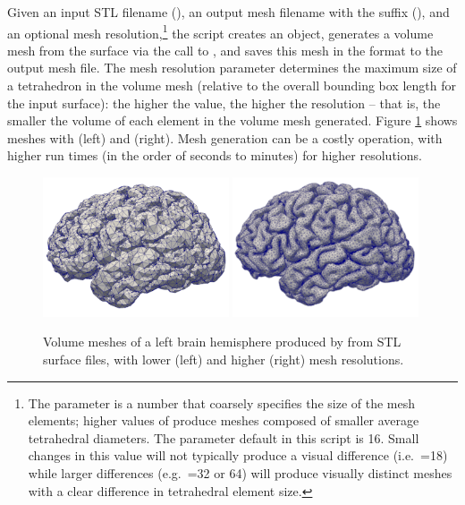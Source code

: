 \noindent Given an input STL filename (), an
output mesh filename with the  suffix
(), and an optional mesh resolution,\footnote{
  The  parameter is a number that coarsely
  specifies the size of the mesh elements; higher values of
   produce meshes composed of smaller
  average tetrahedral diameters. The 
  parameter default in this script is 16. Small changes in this value
  will not typically produce a visual difference
  (i.e.~=18) while larger differences
  (e.g.~=32 or 64) will produce visually
  distinct meshes with a clear difference in tetrahedral element
  size.} the script creates an \svmtk{}  object,
generates a volume mesh from the surface via the call to
, and saves this mesh in the
 format to the output mesh file. The mesh
resolution parameter determines the maximum size of a tetrahedron in
the volume mesh (relative to the overall bounding box length for the
input surface): the higher the value, the higher the resolution --
that is, the smaller the volume of each element in the volume mesh
generated. Figure \ref{fig:chp3:ernie-volume-mesh} shows meshes with
 (left) and  (right). Mesh generation can be a costly operation, with higher
run times (in the order of seconds to minutes) for higher resolutions.
\begin{figure}
  \includegraphics[width=0.49\textwidth]{./graphics/chp3/ernie-volume-16-r.png}
  \includegraphics[width=0.49\textwidth]{./graphics/chp3/ernie-volume-64-r.png}
  \caption{Volume meshes of a left brain hemisphere produced by
    {\svmtk} from STL surface files, with lower (left) and higher
    (right) mesh resolutions.}
  \label{fig:chp3:ernie-volume-mesh}
\end{figure}

